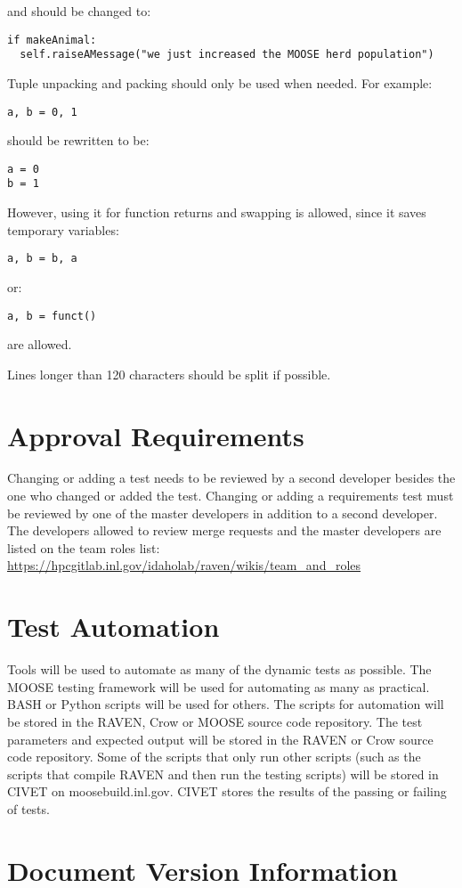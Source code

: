 \documentclass{article}
\begin{document}
and should be changed to:

\begin{verbatim}
if makeAnimal:
  self.raiseAMessage("we just increased the MOOSE herd population")
\end{verbatim}

Tuple unpacking and packing should only be used when needed. For example:

\begin{verbatim}
a, b = 0, 1
\end{verbatim}

should be rewritten to be:

\begin{verbatim}
a = 0
b = 1
\end{verbatim}

However, using it for function returns and swapping is allowed, since
it saves temporary variables:

\begin{verbatim}
a, b = b, a
\end{verbatim}

or:

\begin{verbatim}
a, b = funct()
\end{verbatim}

are allowed.

Lines longer than 120 characters should be split if possible.

\section{Approval Requirements}

Changing or adding a test needs to be reviewed by a second developer
besides the one who changed or added the test.  Changing or adding a
requirements test must be reviewed by one of the master developers in
addition to a second developer.  The developers allowed to review
merge requests and the master developers are listed on the team roles
list:
\url{https://hpcgitlab.inl.gov/idaholab/raven/wikis/team_and_roles}



\section{Test Automation}

Tools will be used to automate as many of the dynamic tests as
possible.  The MOOSE testing framework will be used for automating as
many as practical.  BASH or Python scripts will be used for others.
The scripts for automation will be stored in the RAVEN, Crow or MOOSE
source code repository.  The test parameters and expected output will
be stored in the RAVEN or Crow source code repository. Some of the
scripts that only run other scripts (such as the scripts that compile
RAVEN and then run the testing scripts) will be stored in CIVET on
moosebuild.inl.gov.  CIVET stores the results of the passing or
failing of tests.

\section*{Document Version Information}


\end{document}
